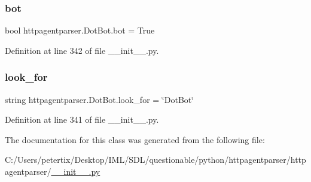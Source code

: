 \subsubsection{\texorpdfstring{bot}{bot}}
{\footnotesize\ttfamily bool httpagentparser.\+Dot\+Bot.\+bot = True\hspace{0.3cm}{\ttfamily [static]}}



Definition at line 342 of file \+\_\+\+\_\+init\+\_\+\+\_\+.\+py.

\hypertarget{classhttpagentparser_1_1_dot_bot_a9128a7e4078a082a15797ee712a8cceb}{}\label{classhttpagentparser_1_1_dot_bot_a9128a7e4078a082a15797ee712a8cceb} 
\subsubsection{\texorpdfstring{look\+\_\+for}{look\_for}}
{\footnotesize\ttfamily string httpagentparser.\+Dot\+Bot.\+look\+\_\+for = \char`\"{}Dot\+Bot\char`\"{}\hspace{0.3cm}{\ttfamily [static]}}



Definition at line 341 of file \+\_\+\+\_\+init\+\_\+\+\_\+.\+py.



The documentation for this class was generated from the following file\+:\begin{DoxyCompactItemize}
\item 
C\+:/\+Users/petertix/\+Desktop/\+I\+M\+L/\+S\+D\+L/questionable/python/httpagentparser/httpagentparser/\hyperlink{____init_____8py}{\+\_\+\+\_\+init\+\_\+\+\_\+.\+py}\end{DoxyCompactItemize}
